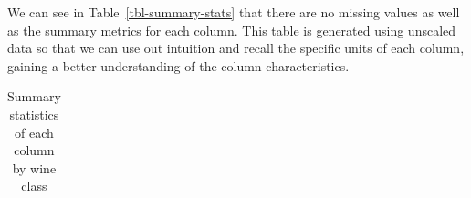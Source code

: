 \documentclass[
  letterpaper,
  DIV=11,
  numbers=noendperiod]{scrartcl}
\begin{document}
\begin{longtable}[]
\end{longtable}

We can see in Table~\ref{tbl-summary-stats} that there are no missing
values as well as the summary metrics for each column. This table is
generated using unscaled data so that we can use out intuition and
recall the specific units of each column, gaining a better understanding
of the column characteristics.

\begin{longtable}[]{@{}
  >{\raggedright\arraybackslash}p{}
  >{\raggedleft\arraybackslash}p{}
  >{\raggedleft\arraybackslash}p{}
  >{\raggedleft\arraybackslash}p{}
  >{\raggedleft\arraybackslash}p{}
  >{\raggedleft\arraybackslash}p{}
  >{\raggedleft\arraybackslash}p{}
  >{\raggedleft\arraybackslash}p{}
  >{\raggedleft\arraybackslash}p{}
  >{\raggedleft\arraybackslash}p{}
  >{\raggedleft\arraybackslash}p{}
  >{\raggedleft\arraybackslash}p{}
  >{\raggedleft\arraybackslash}p{}
  >{\raggedleft\arraybackslash}p{}@{}}

\caption{\label{tbl-summary-stats-class}Summary statistics of each
column by wine class}

\tabularnewline


\end{longtable}
\end{document}
